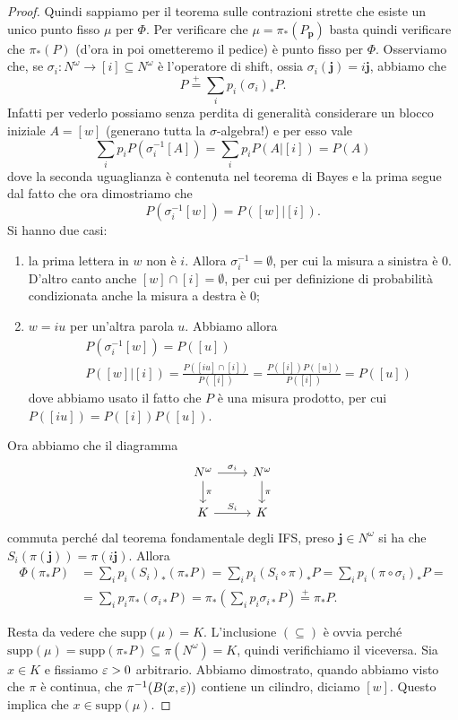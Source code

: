 \begin{proof}
	Quindi sappiamo per il teorema sulle contrazioni strette che esiste un unico punto fisso $\mu$ per $\Phi$. Per verificare che $\mu = \pi_{*}(P_{\mathbf p})$ basta quindi verificare che $\pi_{*}(P)$ (d'ora in poi ometteremo il pedice) è punto fisso per $\Phi$. 
	Osserviamo che, se $\sigma_{i}:N^{\omega}\to [i]\subseteq N^{\omega}$ è l'operatore di shift, ossia $\sigma_{i}(\mathbf j) = i\mathbf j$, abbiamo che 
	$$P \overset{+}{=} \sum_{i}p_{i}(\sigma_{i})_{*}P.$$
	Infatti per vederlo possiamo senza perdita di generalità considerare un blocco iniziale $A = [w]$ (generano tutta la $\sigma$-algebra!) e per esso vale 
	$$\sum_{i} p_{i}P(\sigma_{i}^{-1}[A]) = \sum_{i}p_{i}P(A|[i]) = P(A)$$
	dove la seconda uguaglianza è contenuta nel teorema di Bayes e la prima segue dal fatto che ora dimostriamo che 
	$$P(\sigma_{i}^{-1}[w]) = P([w]|[i]).$$
	Si hanno due casi:
	\begin{enumerate}
		\item la prima lettera in $w$ non è $i$. Allora $\sigma_{i}^{-1} = \emptyset$, per cui la misura a sinistra è 0. D'altro canto anche $[w]\cap[i] = \emptyset$, per cui per definizione di probabilità condizionata anche la misura a destra è 0;
		\item $w = iu$ per un'altra parola $u$. Abbiamo allora 
		\begin{align*}
			& P(\sigma_{i}^{-1}[w]) = P([u])\\
			& P([w]|[i]) = \frac{P([iu]\cap [i])}{P([i])} = \frac{P([i])P([u])}{P([i])} = P([u])
		\end{align*}
		dove abbiamo usato il fatto che $P$ è una misura prodotto, per cui $P([iu]) = P([i])P([u])$.
	\end{enumerate}
	Ora abbiamo che il diagramma
	$$\begin{tikzcd}
		N^\omega \arrow[r, "\sigma_i"] \arrow[d, "\pi"] & N^\omega \arrow[d, "\pi"] \\
		K \arrow[r, "S_i"]                              & K                        
	\end{tikzcd}$$
	commuta perché dal teorema fondamentale degli IFS, preso $\mathbf j \in N^{\omega}$ si ha che $S_{i}(\pi(\mathbf j)) = \pi(i\mathbf j).$
	Allora
	\begin{align*}
		\Phi(\pi_{*}P) &=  
		\sum_{i}p_{i}(S_{i})_{*}(\pi_{*}P) = 
		\sum_{i}p_{i}(S_{i}\circ \pi)_{*}P =
		\sum_{i}p_{i}(\pi\circ \sigma_{i})_{*}P = \\ &=
		\sum_{i}p_{i} \pi_{*}(\sigma_{i*}P) = 
		\pi_{*}\left(\sum_{i}p_{i}\sigma_{i*}P\right) \overset{+}{=} \pi_{*}P.
	\end{align*}
	
	Resta da vedere che $\text{supp}(\mu)= K$.
	L'inclusione $(\subseteq)$ è ovvia perché $\text{supp}(\mu) = \text{supp}(\pi_{*}P) \subseteq \pi(N^{\omega}) = K$, quindi verifichiamo il viceversa. Sia $x\in K$ e fissiamo $\varepsilon>0$ arbitrario. Abbiamo dimostrato, quando abbiamo visto che $\pi$ è continua, che $\pi^{-1}(B(x,\varepsilon))$ contiene un cilindro, diciamo $[w]$. Questo implica che $x\in \text{supp}(\mu)$.
	
\end{proof}



